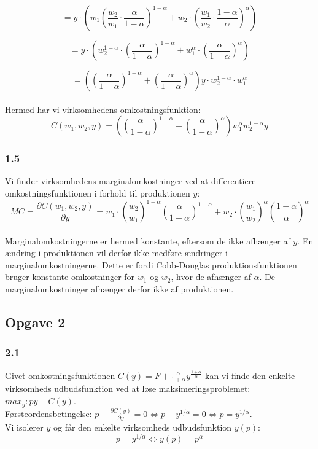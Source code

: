 \documentclass[a4paper, 12pt]{article}
\begin{document}
$$= y \cdot \left(  w_{1} \left( \dfrac{w_{2}}{w_{1}} \cdot  \dfrac{\alpha}{1 - \alpha} \right)^{1 - \alpha}  + w_{2} \cdot  \left( \dfrac{w_{1}}{w_{2}} \cdot \dfrac{1 - \alpha}{\alpha} \right)^{\alpha}  \right) $$

$$= y \cdot \left(  w_{2}^{1 - \alpha} \cdot \left( \dfrac{\alpha}{1 - \alpha} \right)^{1 - \alpha}  + w_{1}^{\alpha} \cdot \left( \dfrac{\alpha}{1 - \alpha} \right)^{\alpha} \right) $$

$$= \left( \left( \dfrac{\alpha}{1 - \alpha} \right)^{1 - \alpha} +  \left( \dfrac{\alpha}{1 - \alpha} \right)^{\alpha} \right) y \cdot w_{2}^{1 - \alpha} \cdot  w_{1}^{\alpha} $$
\\
Hermed har vi virksomhedens omkostningsfunktion:
$$C(w_{1},w_{2},y) =  \left( \left( \dfrac{\alpha}{1 - \alpha} \right)^{1 - \alpha} +  \left( \dfrac{\alpha}{1 - \alpha} \right)^{\alpha} \right) w_{1}^{\alpha} w_{2}^{1 - \alpha} y $$


\subsubsection*{1.5}
Vi finder virksomhedens marginalomkostninger ved at differentiere omkostningsfunktionen i forhold til produktionen $y$:
$$MC = \dfrac{\partial C(w_{1},w_{2},y)}{\partial y} = w_{1} \cdot  \left( \dfrac{w_{2}}{w_{1}} \right)^{1 - \alpha} \left( \dfrac{\alpha}{1 - \alpha} \right)^{1 - \alpha}   + w_{2} \cdot \left( \dfrac{w_{1}}{w_{2}} \right)^{\alpha}  \left( \dfrac{1 - \alpha}{\alpha} \right)^{\alpha}  $$
\\
Marginalomkostningerne er hermed konstante, eftersom de ikke afhænger af $y$. En ændring i produktionen vil derfor ikke medføre ændringer i marginalomkostningerne. Dette er fordi Cobb-Douglas produktionsfunktionen bruger konstante omkostninger for $w_{1}$ og $w_{2}$, hvor de afhænger af $\alpha$. De marginalomkostninger afhænger derfor ikke af produktionen.


\subsection*{Opgave 2}

\subsubsection*{2.1}
Givet omkostningsfunktionen $C(y) = F + \frac{\alpha}{1+ \alpha} y^{\frac{1 + \alpha}{\alpha}}$ kan vi finde den enkelte virksomheds udbudsfunktion ved at løse maksimeringsproblemet: $max_{y}: py -C(y)$.
\\
Førsteordensbetingelse: $p - \frac{\partial C(y)}{\partial y} = 0 \Leftrightarrow p - y^{1/ \alpha} = 0 \Leftrightarrow p = y^{1/ \alpha}$.
\\
Vi isolerer $y$ og får den enkelte virksomheds udbudsfunktion $y(p)$:
$$ p = y^{1/ \alpha} \Leftrightarrow y(p) = p^{\alpha}$$
\end{document}
